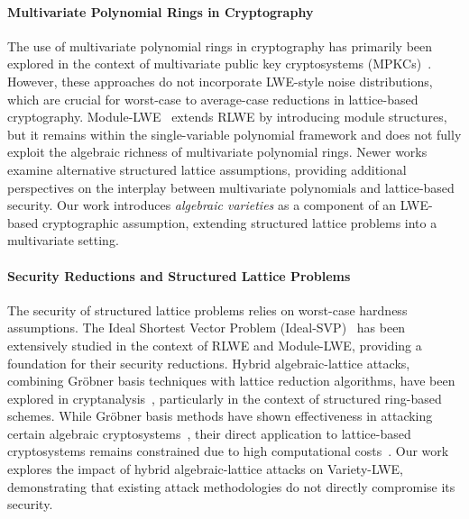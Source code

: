 \paragraph{Multivariate Polynomial Rings in Cryptography}  
The use of multivariate polynomial rings in cryptography has primarily been explored in the context of multivariate public key cryptosystems (MPKCs)~\cite{Patarin1996}. However, these approaches do not incorporate LWE-style noise distributions, which are crucial for worst-case to average-case reductions in lattice-based cryptography. Module-LWE~\cite{Albrecht15} extends RLWE by introducing module structures, but it remains within the single-variable polynomial framework and does not fully exploit the algebraic richness of multivariate polynomial rings. Newer works~\cite{jdey_acs23} examine alternative structured lattice assumptions, providing additional perspectives on the interplay between multivariate polynomials and lattice-based security. Our work introduces \textit{algebraic varieties} as a component of an LWE-based cryptographic assumption, extending structured lattice problems into a multivariate setting.

\paragraph{Security Reductions and Structured Lattice Problems}  
The security of structured lattice problems relies on worst-case hardness assumptions. The Ideal Shortest Vector Problem (Ideal-SVP)~\cite{Peikert16} has been extensively studied in the context of RLWE and Module-LWE, providing a foundation for their security reductions. Hybrid algebraic-lattice attacks, combining Gröbner basis techniques with lattice reduction algorithms, have been explored in cryptanalysis~\cite{hzhu_iwsec23}, particularly in the context of structured ring-based schemes. While Gröbner basis methods have shown effectiveness in attacking certain algebraic cryptosystems~\cite{Faugere2002}, their direct application to lattice-based cryptosystems remains constrained due to high computational costs~\cite{pravi_tecs24}. Our work explores the impact of hybrid algebraic-lattice attacks on Variety-LWE, demonstrating that existing attack methodologies do not directly compromise its security.

